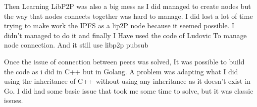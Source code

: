 \documentclass{IEEEtran}
\begin{document}
Then Learning LibP2P was also a big mess as I did managed to 
create nodes but the way that nodes connects together was hard 
to manage. I did lost a lot of time trying to make work the IPFS 
as a lip2P node because it seemed possible. I didn't managed to do 
it and finally I Have used the code of Ludovic To manage node 
connection. And it still use libp2p pubsub 

Once the issue of connection between peers was solved, It was 
possible to build the code as i did in C++ but in Golang. A 
problem was adapting what I did using the inheritance of C++
without using any inheritance as it doesn't exist in Go.
I did had some basic issue that took me some time to solve, but
it was classic issues.
\end{document}
